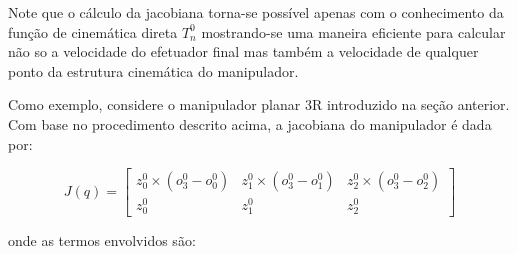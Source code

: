 Note que o cálculo da jacobiana torna-se possível apenas com o conhecimento da
função de cinemática direta \(T_n^0\) mostrando-se uma maneira eficiente para calcular 
não so a velocidade do efetuador final mas também a velocidade de qualquer ponto da 
estrutura cinemática do manipulador.

Como exemplo, considere o manipulador planar 3R introduzido na seção anterior.
Com base no procedimento descrito acima, a jacobiana do manipulador é dada por:

\begin{equation}
    J(q) = \begin{bmatrix}
        z_0^0 \times (o_3^0 - o_0^0) & z_1^0 \times (o_3^0 - o_1^0) & z_2^0 \times (o_3^0 - o_2^0) \\
        z_0^0                        & z_1^0                        & z_2^0
    \end{bmatrix}
\end{equation}

onde as termos envolvidos são:

